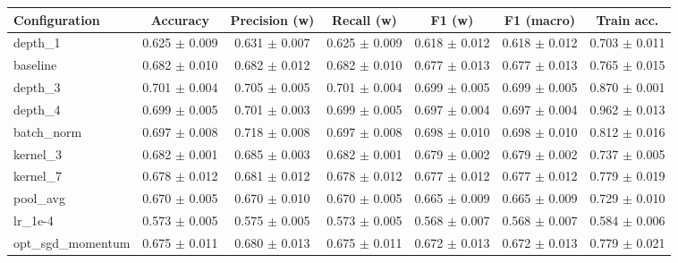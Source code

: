 \begin{tabular}{lcccccc}
\hline
Configuration & Accuracy & Precision (w) & Recall (w) & F1 (w) & F1 (macro) & Train acc. \\
\hline
depth\_1 & 0.625 $\pm$ 0.009 & 0.631 $\pm$ 0.007 & 0.625 $\pm$ 0.009 & 0.618 $\pm$ 0.012 & 0.618 $\pm$ 0.012 & 0.703 $\pm$ 0.011 \\
baseline & 0.682 $\pm$ 0.010 & 0.682 $\pm$ 0.012 & 0.682 $\pm$ 0.010 & 0.677 $\pm$ 0.013 & 0.677 $\pm$ 0.013 & 0.765 $\pm$ 0.015 \\
depth\_3 & 0.701 $\pm$ 0.004 & 0.705 $\pm$ 0.005 & 0.701 $\pm$ 0.004 & 0.699 $\pm$ 0.005 & 0.699 $\pm$ 0.005 & 0.870 $\pm$ 0.001 \\
depth\_4 & 0.699 $\pm$ 0.005 & 0.701 $\pm$ 0.003 & 0.699 $\pm$ 0.005 & 0.697 $\pm$ 0.004 & 0.697 $\pm$ 0.004 & 0.962 $\pm$ 0.013 \\
batch\_norm & 0.697 $\pm$ 0.008 & 0.718 $\pm$ 0.008 & 0.697 $\pm$ 0.008 & 0.698 $\pm$ 0.010 & 0.698 $\pm$ 0.010 & 0.812 $\pm$ 0.016 \\
kernel\_3 & 0.682 $\pm$ 0.001 & 0.685 $\pm$ 0.003 & 0.682 $\pm$ 0.001 & 0.679 $\pm$ 0.002 & 0.679 $\pm$ 0.002 & 0.737 $\pm$ 0.005 \\
kernel\_7 & 0.678 $\pm$ 0.012 & 0.681 $\pm$ 0.012 & 0.678 $\pm$ 0.012 & 0.677 $\pm$ 0.012 & 0.677 $\pm$ 0.012 & 0.779 $\pm$ 0.019 \\
pool\_avg & 0.670 $\pm$ 0.005 & 0.670 $\pm$ 0.010 & 0.670 $\pm$ 0.005 & 0.665 $\pm$ 0.009 & 0.665 $\pm$ 0.009 & 0.729 $\pm$ 0.010 \\
lr\_1e-4 & 0.573 $\pm$ 0.005 & 0.575 $\pm$ 0.005 & 0.573 $\pm$ 0.005 & 0.568 $\pm$ 0.007 & 0.568 $\pm$ 0.007 & 0.584 $\pm$ 0.006 \\
opt\_sgd\_momentum & 0.675 $\pm$ 0.011 & 0.680 $\pm$ 0.013 & 0.675 $\pm$ 0.011 & 0.672 $\pm$ 0.013 & 0.672 $\pm$ 0.013 & 0.779 $\pm$ 0.021 \\
\hline
\end{tabular}
